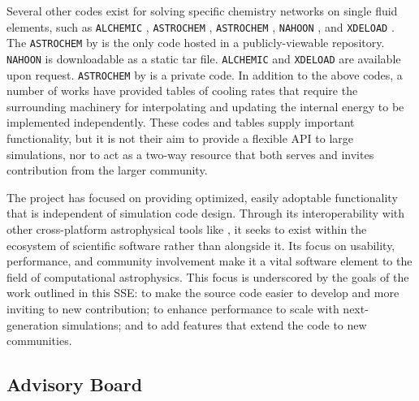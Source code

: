 Several other codes exist for solving specific chemistry
networks on single fluid elements, such as 
\texttt{ALCHEMIC} \citep{2010A&A...522A..42S}, \texttt{ASTROCHEM}
\citep{2013MNRAS.431..455K}, \texttt{ASTROCHEM} \citep[][unrelated to
the first \texttt{ASTROCHEM}]{2013A&A...559A..53M}, \texttt{NAHOON}
\citep{2012ApJS..199...21W}, and \texttt{XDELOAD}
\citep{2005Ap&SS.299....1N}.  The \texttt{ASTROCHEM} by
\citet{2013A&A...559A..53M} is the only code hosted in a
publicly-viewable repository.  \texttt{NAHOON} is downloadable as a
static tar file.  \texttt{ALCHEMIC} and \texttt{XDELOAD} are available
upon request.  \texttt{ASTROCHEM} by \citet{2013MNRAS.431..455K} is a
private code.
In addition to the above codes, a number of works have provided tables
of cooling rates \citep{1993ApJS...88..253S, 2009MNRAS.393...99W,
2013MNRAS.434.1043O} that require the surrounding machinery for
interpolating and updating the internal energy to be implemented
independently.
These codes and tables supply important functionality, but it is
not their aim to provide a flexible API to large simulations, nor to
act as a two-way resource that both serves and invites contribution
from the larger community.

The \grackle{} project has focused on providing optimized, easily
adoptable functionality that is independent of simulation code
design.  Through its interoperability with other cross-platform
astrophysical tools like \yt{}, it seeks to exist within the
ecosystem of scientific software rather than alongside it.
Its focus on usability, performance, and community
involvement make it a vital software element to the field of
computational astrophysics.  This focus is underscored by the goals
of the work outlined in this SSE:
to make the source code easier to develop and more inviting to new
contribution; to enhance performance to scale with next-generation
simulations; and to add features that extend the code to new
communities.

\subsection{Advisory Board}

